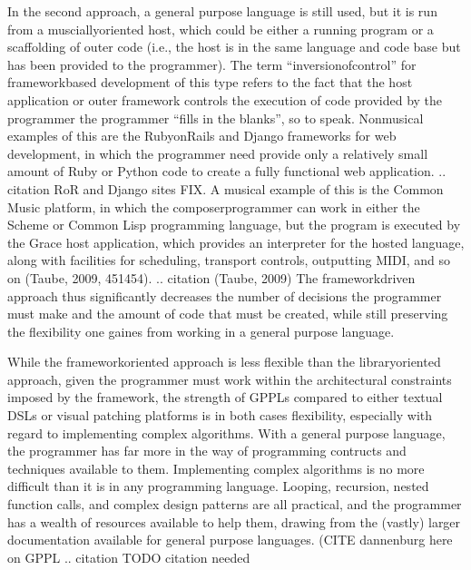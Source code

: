 \documentclass[letterpaper,10pt,english]{sphinxmanual}
\begin{document}
\sphinxAtStartPar
In the second approach, a general purpose language is still used,
but it is run from a muscially\sphinxhyphen{}oriented host, which could be either
a running program or a scaffolding of outer code (i.e., the host
is in the same language and code base but has been provided to the programmer).
The term “inversion\sphinxhyphen{}of\sphinxhyphen{}control” for framework\sphinxhyphen{}based development of this type refers to the fact
that the host application or outer framework controls the execution of
code provided by the programmer \sphinxhyphen{} the programmer “fills in the blanks”, so to speak.
Non\sphinxhyphen{}musical examples of this are the Ruby\sphinxhyphen{}on\sphinxhyphen{}Rails and Django frameworks for web development,
in which the programmer need provide only a relatively small amount of Ruby or Python
code to create a fully functional web application.
.. citation RoR and Django sites FIX.
A musical example of this is the Common Music platform, in which
the composer\sphinxhyphen{}programmer can work in either the Scheme or Common Lisp programming language,
but the program is executed by the Grace host application, which
provides an interpreter for the hosted language, along
with facilities for scheduling, transport controls, outputting MIDI, and so on (Taube, 2009, 451\sphinxhyphen{}454).
.. citation (Taube, 2009)
The framework\sphinxhyphen{}driven approach thus significantly decreases the number
of decisions the programmer must make and the amount of code that
must be created, while still preserving the flexibility one gaines from
working in a general purpose language.

\sphinxAtStartPar
While the framework\sphinxhyphen{}oriented approach is less flexible than the
library\sphinxhyphen{}oriented approach, given the programmer must work within the architectural
constraints imposed by the framework, the strength of GPPLs compared to either
textual DSLs or visual patching platforms is in both cases flexibility, especially with
regard to implementing complex algorithms.
With a general purpose language, the programmer has far more in the way
of programming contructs and techniques available to them.
Implementing complex algorithms is no more difficult than it is in any
programming language. Looping, recursion, nested function calls, and complex
design patterns are all practical, and the programmer has a wealth of resources
available to help them, drawing from the (vastly) larger documentation
available for general purpose languages. (CITE dannenburg here on GPPL
.. citation TODO citation needed
\end{document}

